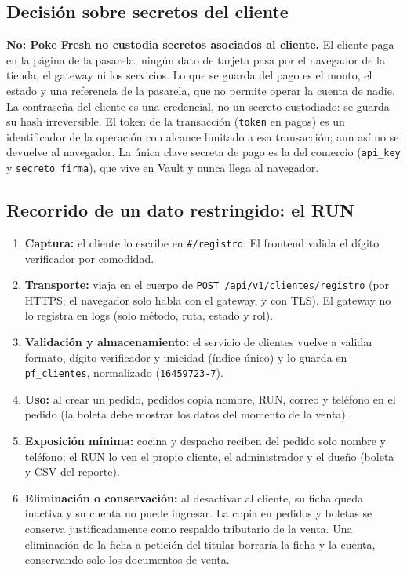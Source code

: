 \subsection{Decisión sobre secretos del cliente}

\textbf{No: Poke Fresh no custodia secretos asociados al cliente.} El cliente paga en la página de la pasarela; ningún dato de tarjeta pasa por el navegador de la tienda, el gateway ni los servicios. Lo que se guarda del pago es el monto, el estado y una referencia de la pasarela, que no permite operar la cuenta de nadie. La contraseña del cliente es una credencial, no un secreto custodiado: se guarda su hash irreversible. El token de la transacción (\texttt{token} en pagos) es un identificador de la operación con alcance limitado a esa transacción; aun así no se devuelve al navegador. La única clave secreta de pago es la del comercio (\texttt{api\_\allowbreak{}key} y \texttt{secreto\_\allowbreak{}firma}), que vive en Vault y nunca llega al navegador.


\subsection{Recorrido de un dato restringido: el RUN}

\begin{enumerate}[nosep,leftmargin=*]
\item \textbf{Captura:} el cliente lo escribe en \texttt{\#/\allowbreak{}registro}. El frontend valida el dígito verificador por comodidad.
\item \textbf{Transporte:} viaja en el cuerpo de \texttt{POST /\allowbreak{}api/\allowbreak{}v1/\allowbreak{}clientes/\allowbreak{}registro} (por HTTPS; el navegador solo habla con el gateway, y con TLS). El gateway no lo registra en logs (solo método, ruta, estado y rol).
\item \textbf{Validación y almacenamiento:} el servicio de clientes vuelve a validar formato, dígito verificador y unicidad (índice único) y lo guarda en \texttt{pf\_\allowbreak{}clientes}, normalizado (\texttt{16459723-\allowbreak{}7}).
\item \textbf{Uso:} al crear un pedido, pedidos copia nombre, RUN, correo y teléfono en el pedido (la boleta debe mostrar los datos del momento de la venta).
\item \textbf{Exposición mínima:} cocina y despacho reciben del pedido solo nombre y teléfono; el RUN lo ven el propio cliente, el administrador y el dueño (boleta y CSV del reporte).
\item \textbf{Eliminación o conservación:} al desactivar al cliente, su ficha queda inactiva y su cuenta no puede ingresar. La copia en pedidos y boletas se conserva justificadamente como respaldo tributario de la venta. Una eliminación de la ficha a petición del titular borraría la ficha y la cuenta, conservando solo los documentos de venta.
\end{enumerate}

